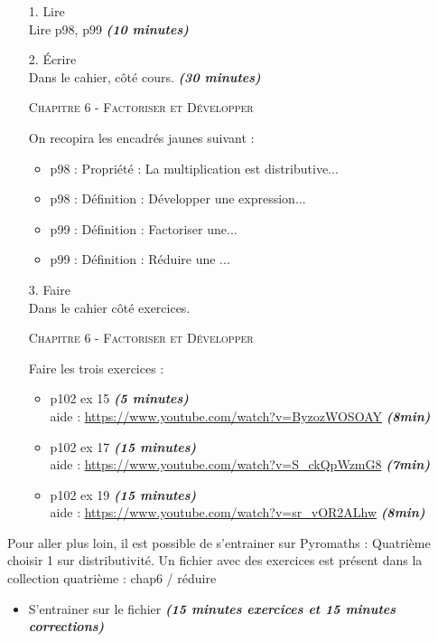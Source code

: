 \documentclass[11pt]{article}
\newcommand{\tempsexo}[1]{\textit{\textbf{(#1)}}}
\begin{document}
\begin{enumerate}
\item[1.] \huge{Lire} \\ \normalsize 
Lire p98, p99 \tempsexo{10 minutes}

\item[2.] \huge{Écrire} \\ \normalsize 
  Dans le cahier, côté cours. \tempsexo{30 minutes}

	\textsc{Chapitre 6 - Factoriser et Développer}
	
	On recopira les encadrés jaunes suivant :
	\begin{itemize}
  		\item p98 : Propriété : La multiplication est distributive...
		\item p98 : Définition : Développer une expression...
		\item p99 : Définition : Factoriser une...
		\item p99 : Définition : Réduire une ...
  	\end{itemize}


\item[3.] \huge{Faire} \\ \normalsize 
Dans le cahier côté exercices. 

	\textsc{Chapitre 6 - Factoriser et Développer}
	
	Faire les trois exercices :
	\begin{itemize}
		\item p102 ex 15 \tempsexo{5 minutes} \\
		aide : \url{https://www.youtube.com/watch?v=ByzozWOSOAY} \tempsexo{8min}
		\item p102 ex 17 \tempsexo{15 minutes} \\
		aide : \url{https://www.youtube.com/watch?v=S_ckQpWzmG8} \tempsexo{7min}
		\item p102 ex 19  \tempsexo{15 minutes} \\
		aide : \url{https://www.youtube.com/watch?v=sr_vOR2ALhw} \tempsexo{8min}
  \end{itemize}

\end{enumerate}		

Pour aller plus loin, il est possible de s'entrainer sur Pyromaths : Quatrième choisir 1 sur distributivité. Un fichier avec des exercices est présent dans la collection quatrième : chap6 / réduire

	\begin{itemize}
		\item S'entrainer sur le fichier \tempsexo{15 minutes exercices et 15 minutes corrections}
	\end{itemize}
\end{document}
